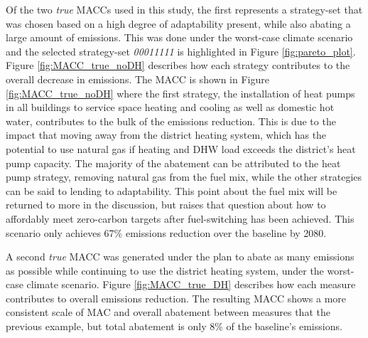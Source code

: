 \documentclass[twocolumn, a4paper,10pt]{article}
\begin{document}
Of the two \textit{true} MACCs used in this study, the first represents a strategy-set that was chosen based on a high degree of adaptability present, while also abating a large amount of emissions. This was done under the worst-case climate scenario and the selected strategy-set \textit{00011111} is highlighted in Figure \ref{fig:pareto_plot}. Figure \ref{fig:MACC_true_noDH} describes how each strategy contributes to the overall decrease in emissions. The MACC is shown in Figure \ref{fig:MACC_true_noDH} where the first strategy, the installation of heat pumps in all buildings to service space heating and cooling as well as domestic hot water, contributes to the bulk of the emissions reduction. This is due to the impact that moving away from the district heating system, which has the potential to use natural gas if heating and DHW load exceeds the district's heat pump capacity. The majority of the abatement can be attributed to the heat pump strategy, removing natural gas from the fuel mix, while the other strategies can be said to lending to adaptability. This point about the fuel mix will be returned to more in the discussion, but raises that question about how to affordably meet zero-carbon targets after fuel-switching has been achieved. This scenario only achieves 67\% emissions reduction over the baseline by 2080.



A second \textit{true} MACC was generated under the plan to abate as many emissions as possible while continuing to use the district heating system, under the worst-case climate scenario. Figure \ref{fig:MACC_true_DH} describes how each measure contributes to overall emissions reduction. The resulting MACC shows a more consistent scale of MAC and overall abatement between measures that the previous example, but total abatement is only 8\% of the baseline's emissions.



\end{document}
